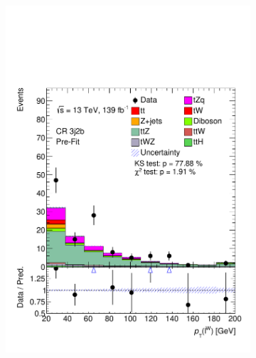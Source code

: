 \begin{figure}[!h]
\begin{subfigure}[b]{0.33\linewidth}
    \includegraphics[width=\linewidth]{ubonn-thesis/Chapters/Chapters_06/Figure/Input_distribution/CR_3j2b_lepW_pt.pdf} 
  \end{subfigure} 
  \newline
  \begin{subfigure}[b]{0.33\linewidth}
    \centering

\end{subfigure}
\end{figure}
